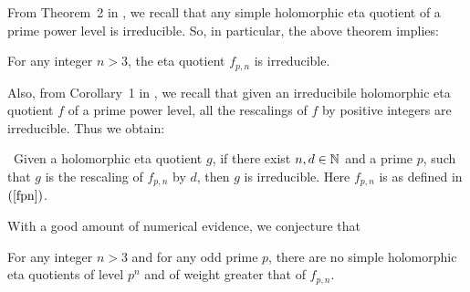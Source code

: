 \documentclass[a4paper,11pt]{amsart}
\begin{document}
From Theorem~2 in \cite{B-three}, we recall that any simple
holomorphic eta quotient of a prime power level is irreducible.
So, in particular, the above theorem implies:
\begin{co}
  For any integer $n>3$, the eta quotient $f_{p,n}$ is %
irreducible.
\end{co}
Also, from Corollary~1 in \cite{B-three}, we recall that given an irreducibile
holomorphic eta quotient $f$ of a prime power level, all the rescalings of $f$
by positive integers are irreducible. Thus we obtain:
\begin{co}
\ \newline Given a holomorphic eta quotient $g$, if there exist
 $n,d\in\mathbb{N}$ and a prime $p$, such that
 $g$ is the rescaling of $f_{p,n}$ by $d$, then $g$ is irreducible.
 Here $f_{p,n}$ is as defined in $(\ref{fpn})$.
\end{co}

With a good amount of numerical evidence, we conjecture that %
\begin{conj}
 For any integer $n>3$ and for any odd prime $p$, there are no simple holomorphic eta quotients of level $p^{n}$ and of weight greater that of $f_{p,n}$.
\end{conj}
\end{document}
